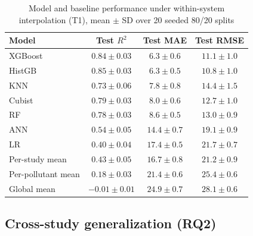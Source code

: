 \begin{table}[t]
\centering
\caption{Model and baseline performance under within-system
interpolation (T1), mean $\pm$ SD over 20 seeded 80/20 splits}
\label{tab:interp}
\begin{tabular}{lccc}
\toprule
Model & Test $R^2$ & Test MAE & Test RMSE \\
\midrule
XGBoost & $0.84 \pm 0.03$ & $6.3 \pm 0.6$ & $11.1 \pm 1.0$ \\
HistGB  & $0.85 \pm 0.03$ & $6.3 \pm 0.5$ & $10.8 \pm 1.0$ \\
KNN     & $0.73 \pm 0.06$ & $7.8 \pm 0.8$ & $14.4 \pm 1.5$ \\
Cubist  & $0.79 \pm 0.03$ & $8.0 \pm 0.6$ & $12.7 \pm 1.0$ \\
RF      & $0.78 \pm 0.03$ & $8.6 \pm 0.5$ & $13.0 \pm 0.9$ \\
ANN     & $0.54 \pm 0.05$ & $14.4 \pm 0.7$ & $19.1 \pm 0.9$ \\
LR      & $0.40 \pm 0.04$ & $17.4 \pm 0.5$ & $21.7 \pm 0.7$ \\
\midrule
Per-study mean     & $0.43 \pm 0.05$ & $16.7 \pm 0.8$ & $21.2 \pm 0.9$ \\
Per-pollutant mean & $0.18 \pm 0.03$ & $21.4 \pm 0.6$ & $25.4 \pm 0.6$ \\
Global mean        & $-0.01 \pm 0.01$ & $24.9 \pm 0.7$ & $28.1 \pm 0.6$ \\
\bottomrule
\end{tabular}
\end{table}

\subsection{Cross-study generalization (RQ2)}
\label{sec:rq2}

